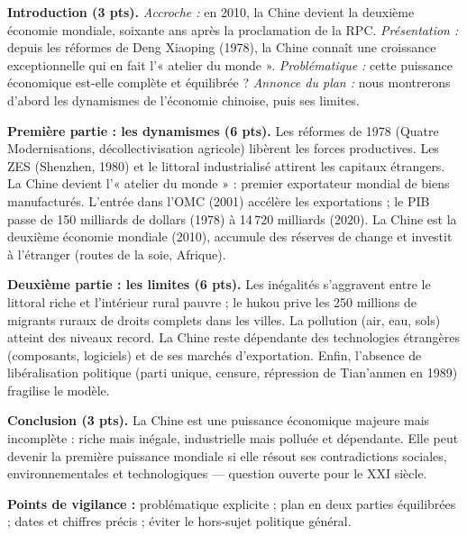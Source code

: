 \documentclass[11pt]{article}
\newcommand{\cle}[1]{{\popxbold\color{popdark}#1}}
\begin{document}
\begin{corrige}
\textbf{Introduction (3 pts).} \emph{Accroche :} en 2010, la Chine devient la deuxième économie mondiale, soixante ans après la proclamation de la RPC. \emph{Présentation :} depuis les réformes de Deng Xiaoping (1978), la Chine connaît une croissance exceptionnelle qui en fait l'« atelier du monde ». \emph{Problématique :} cette puissance économique est-elle complète et équilibrée ? \emph{Annonce du plan :} nous montrerons d'abord les dynamismes de l'économie chinoise, puis ses limites.

\textbf{Première partie : les dynamismes (6 pts).} Les réformes de 1978 (Quatre Modernisations, décollectivisation agricole) libèrent les forces productives. Les ZES (Shenzhen, 1980) et le littoral industrialisé attirent les capitaux étrangers. La Chine devient l'« atelier du monde » : premier exportateur mondial de biens manufacturés. L'entrée dans l'OMC (2001) accélère les exportations ; le PIB passe de 150 milliards de dollars (1978) à 14\,720 milliards (2020). La Chine est la deuxième économie mondiale (2010), accumule des réserves de change et investit à l'étranger (routes de la soie, Afrique).

\textbf{Deuxième partie : les limites (6 pts).} Les inégalités s'aggravent entre le littoral riche et l'intérieur rural pauvre ; le \cle{hukou} prive les 250 millions de migrants ruraux de droits complets dans les villes. La pollution (air, eau, sols) atteint des niveaux record. La Chine reste dépendante des technologies étrangères (composants, logiciels) et de ses marchés d'exportation. Enfin, l'absence de libéralisation politique (parti unique, censure, répression de Tian'anmen en 1989) fragilise le modèle.

\textbf{Conclusion (3 pts).} La Chine est une puissance économique majeure mais incomplète : riche mais inégale, industrielle mais polluée et dépendante. Elle peut devenir la première puissance mondiale si elle résout ses contradictions sociales, environnementales et technologiques — question ouverte pour le XXI\ieme{} siècle.

\textbf{Points de vigilance :} problématique explicite ; plan en deux parties équilibrées ; dates et chiffres précis ; éviter le hors-sujet politique général.
\end{corrige}
\end{document}
